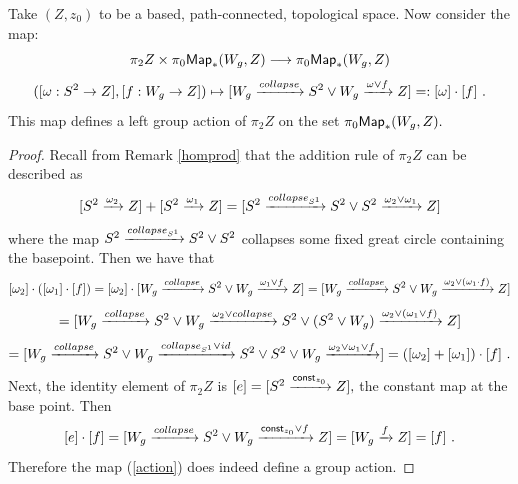 \begin{lemma}
Take $(Z, z_{0})$ to be a based, path-connected, topological space. Now consider the map: 
\[
\pi_{2}Z \times \pi_{0}{\sf Map}_{\ast}(W_{g}, Z) \longrightarrow \pi_{0}{\sf Map}_{\ast}(W_{g}, Z)\]
\begin{equation} \label{action}([\omega: S^{2} \rightarrow Z], [f: W_{g} \rightarrow Z]) \mapsto [W_{g} \xrightarrow{collapse} S^{2} \vee W_{g} \xrightarrow{\omega \vee f} Z] =: [\omega] \cdot [f]~. \end{equation}
This map defines a left group action of $\pi_{2}Z$ on the set $\pi_{0}{\sf Map}_{\ast}(W_{g}, Z).$
\end{lemma}
\begin{proof}
Recall from Remark \ref{homprod} that the addition rule of $\pi_{2}Z$ can be described as 
\[
[S^{2} \xrightarrow{\omega_{2}} Z] + [S^{2} \xrightarrow{\omega_{1}} Z] = [S^{2} \xrightarrow{collapse_{S^{1}}} S^{2} \vee S^{2} \xrightarrow{\omega_{2} \vee \omega_{1}} Z]
\] where the map $S^{2} \xrightarrow{collapse_{S^{1}}} S^{2} \vee S^{2}$ collapses some fixed great circle containing the basepoint. Then we have that 
\[
[\omega_{2}] \cdot ([\omega_{1}] \cdot [f]) = [\omega_{2}] \cdot [W_{g} \xrightarrow{collapse} S^{2} \vee W_{g} \xrightarrow{\omega_{1} \vee f} Z] = [W_{g} \xrightarrow{collapse} S^{2} \vee W_{g} \xrightarrow{\omega_{2} \vee (\omega_{1} \cdot f)} Z]
\]
\[
= [W_{g} \xrightarrow{collapse} S^{2} \vee W_{g} \xrightarrow{\omega_{2} \vee collapse} S^{2} \vee (S^{2} \vee W_{g}) \xrightarrow{\omega_{2} \vee (\omega_{1} \vee f)} Z]
\]
\[
= [W_{g} \xrightarrow{collapse} S^{2} \vee W_{g} \xrightarrow{collapse_{S^{1}} \vee id} S^{2} \vee S^{2} \vee W_{g} \xrightarrow{\omega_{2} \vee \omega_{1} \vee f}] = ([\omega_{2}] + [\omega_{1}]) \cdot [f]~.
\]
Next, the identity element of $\pi_{2}Z$ is $[e] = [S^{2} \xrightarrow{{\sf const}_{z_{0}}} Z],$ the constant map at the base point. Then
\[
[e] \cdot [f] = [W_{g} \xrightarrow{collapse} S^{2} \vee W_{g} \xrightarrow{{\sf const}_{z_{0}} \vee f} Z] = [W_{g} \xrightarrow{f} Z] = [f]~. 
\] 
Therefore the map (\ref{action}) does indeed define a group action.
\end{proof}

